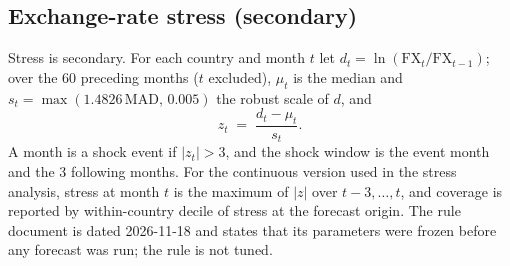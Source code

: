 \subsection{Exchange-rate stress (secondary)}\label{sec:stress}

Stress is secondary. For each country and month $t$ let $d_t=\ln(\mathrm{FX}_t/\mathrm{FX}_{t-1})$; over the 60 preceding months ($t$ excluded), $\mu_t$ is the median and $s_t=\max(1.4826\,\mathrm{MAD},\,0.005)$ the robust scale of $d$, and
\begin{equation}\label{eq:stress}
z_t \;=\; \frac{d_t-\mu_t}{s_t}.
\end{equation}
A month is a shock event if $|z_t|>3$, and the shock window is the event month and the 3 following months. For the continuous version used in the stress analysis, stress at month $t$ is the maximum of $|z|$ over $t-3,\dots,t$, and coverage is reported by within-country decile of stress at the forecast origin. The rule document is dated 2026-11-18 and states that its parameters were frozen before any forecast was run; the rule is not tuned.
